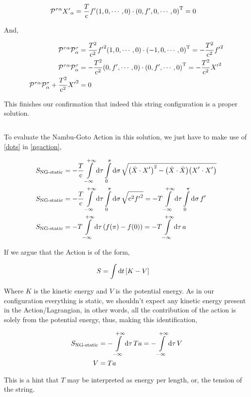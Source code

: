 \begin{align*}
    \mathcal P^{\tau\alpha}{X'}_\alpha&=\frac{T}{\textnormal{c}}f'\qty(1,0,\cdots,0)\cdot{\qty(0,f',0,\cdots,0)}^{\textnormal{T}}=0
\end{align*}

And,

\begin{align*}
    \mathcal P^{\tau\alpha}\mathcal P^{\tau}_\alpha&=\frac{T^2}{\textnormal{c}^2}{f'}^2\qty(1,0,\cdots,0)\cdot{\qty(-1,0,\cdots,0)}^{\textnormal{T}}=-\frac{T^2}{\textnormal{c}^2}{f'}^2\\
    \mathcal P^{\tau\alpha}\mathcal P^{\tau}_\alpha&=-\frac{T^2}{\textnormal{c}^2}\qty(0,f',\cdots,0)\cdot{\qty(0,f',\cdots,0)}^{\textnormal{T}}=-\frac{T^2}{\textnormal{c}^2}{X'}^2\\
    \mathcal P^{\tau\alpha}\mathcal P^{\tau}_\alpha+\frac{T^2}{\textnormal{c}^2}{X'}^2&=0
\end{align*}

This finishes our confirmation that indeed this string configuration is a proper solution.

\subsection{}

To evaluate the Nambu-Goto Action in this solution, we just have to make use of \ref{dots} in \ref{ngaction},

\begin{align*}
    S_{\textnormal{NG-static}}&=-\frac{T}{\luz}\int\limits_{-\infty}^{+\infty}\dd{\tau}\int\limits_0^\pi\dd{\sigma}\sqrt{\qty(\dot X\cdot X^\sidev)^2- \qty(\dot X\cdot \dot X)\qty(X^\sidev\cdot X^\sidev) }\\
    S_{\textnormal{NG-static}}&=-\frac{T}{\luz}\int\limits_{-\infty}^{+\infty}\dd{\tau}\int\limits_0^\pi\dd{\sigma}\sqrt{\luz^2{f'}^2}=-T\int\limits_{-\infty}^{+\infty}\dd{\tau}\int\limits_0^\pi\dd{\sigma}f'\\
    S_{\textnormal{NG-static}}&=-T\int\limits_{-\infty}^{+\infty}\dd{\tau}\qty(f\qty(\pi)-f(0))=-T\int\limits_{-\infty}^{+\infty}\dd{\tau}a
\end{align*}

If we argue that the Action is of the form,

\begin{align*}
    S&=\int\dd{t}\qty[K-V]
\end{align*}

Where $K$ is the kinetic energy and $V$ is the potential energy. As in our configuration everything is static, we shouldn't expect any kinetic energy present in the Action/Lagrangian, in other words, all the contribution of the action is solely from 
the potential energy, thus, making this identification,

\begin{align*}
    S_{\textnormal{NG-static}}&=-\int\limits_{-\infty}^{+\infty}\dd{\tau}Ta=-\int\limits_{-\infty}^{+\infty}\dd{\tau}V\\
    V&=Ta
\end{align*}

This is a hint that $T$ may be interpreted as energy per length, or, the tension of the string.
